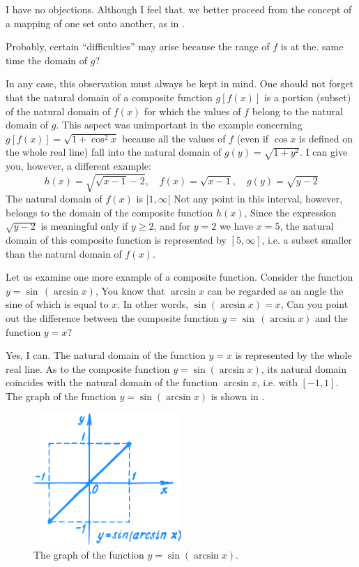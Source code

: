 {\athr I have no objections. Although I feel that. we better proceed from the concept of a mapping of one set onto another, as in .

\rdr Probably, certain ``difficulties'' may arise because the range of $f$ is at the. same time the domain of $g$? 

\athr In any case, this observation must always be kept in mind. One should not forget that the natural domain of a composite function $g [f (x)]$ is a portion (subset) of the natural domain of $f(x)$ for which the values of $f$ belong to the natural domain of $g$. This aspect was unimportant
in the example concerning $g [f (x)] = \sqrt{ 1 + \cos^{2} x}$ because all the values of $f$ (even if $\cos x$ is defined on the whole real line) fall into the natural domain of $g (y) = \sqrt{1 +y^{2}}$. I can give you, however, a different example:
\begin{equation*}%
h(x) = \sqrt{\sqrt{x-1} -2}, \quad f (x) = \sqrt{x-1}, \quad  g(y)=\sqrt{y -2}
\end{equation*}
The natural domain of $f (x)$ is $[1, \infty[$ Not any point in this interval, however, belongs to the domain of the composite function $h (x)$, Since the expression $\sqrt{y - 2}$ is meaningful only if $y \geqslant 2$, and for $y = 2$ we have $x = 5$, the natural domain of this composite function is represented by $[5, \infty]$, i.e. a subset smaller than the natural domain of $f (x)$.

Let us examine one more example of a composite function. Consider the function $y = \sin \,(\arcsin x)$, You know that $\arcsin x$ can be regarded as an angle the sine of which is equal to $x$. In other words, $\sin(\arcsin x) = x$, Can you point out the difference between the composite function $y = \sin \, (\arcsin x) $ and the function $y = x$?

\rdr Yes, I can. The natural domain of the function $y = x$ is represented by the whole real line. As to the composite function $y = \sin (\arcsin x)$, its natural domain coincides with the natural domain of the function $\arcsin x
$, i.e. with $[-1, 1]$. The graph of the function $y = \sin (\arcsin x)$ is shown in .
\begin{figure}[!ht]%
\centering
\includegraphics[width=0.5\textwidth]{figures/fig-23.pdf}
\caption{The graph of the function $y = \sin (\arcsin x)$.}
\label{fig-23}
\end{figure}

}
